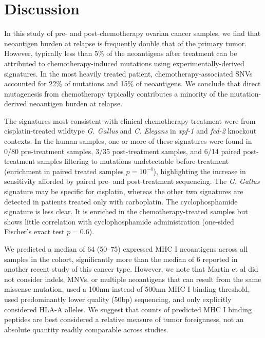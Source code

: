 \section*{Discussion}

In this study of pre- and post-chemotherapy ovarian cancer samples, we find that neoantigen burden at relapse is frequently double that of the primary tumor. However, typically less than 5\% of the neoantigens after treatment can be attributed to chemotherapy-induced mutations using experimentally-derived signatures. In the most heavily treated patient, chemotherapy-associated SNVs accounted for 22\% of mutations and 15\% of neoantigens. We conclude that direct mutagenesis from chemotherapy typically contributes a minority of the mutation-derived neoantigen burden at relapse.

The signatures most consistent with clinical chemotherapy treatment were from cisplatin-treated wildtype \textit{G. Gallus} and \textit{C. Elegans} in \textit{xpf-1} and \textit{fcd-2} knockout contexts. In the human samples, one or more of these signatures were found in 0/80 pre-treatment samples, 3/35 post-treatment samples, and 6/14 paired post-treatment samples filtering to mutations undetectable before treatment (enrichment in paired treated samples $p=10^{-4}$), highlighting the increase in sensitivity afforded by paired pre- and post-treatment sequencing. The \textit{G. Gallus} signature may be specific for cisplatin, whereas the other two signatures are detected in patients treated only with carboplatin. The cyclophosphamide signature is less clear. It is enriched in the chemotherapy-treated samples but shows little correlation with cyclophosphamide administration (one-sided Fischer's exact test $p=0.6$).


We predicted a median of 64 (50--75) expressed MHC I neoantigens across all samples in the cohort, significantly more than the median of 6 reported in another recent study of this cancer type\cite{Martin_2016}. However, we note that Martin et al did not consider indels, MNVs, or multiple neoantigens that can result from the same missense mutation, used a 100nm instead of 500nm MHC I binding threshold, used predominantly lower quality (50bp) sequencing, and only explicitly considered HLA-A alleles. We suggest that counts of predicted MHC I binding peptides are best considered a relative measure of tumor foreignness, not an absolute quantity readily comparable across studies.

